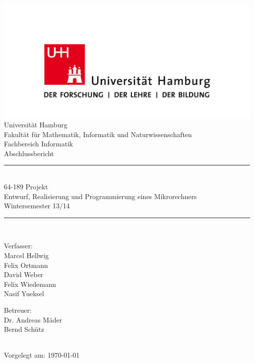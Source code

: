 


\begin{fullsizetitle}
\centering
\begin{minipage}{0.75\textwidth}
\vspace*{5em}
\begin{center}
\includegraphics[width=\textwidth]{images/uhh.png}\\
\vspace*{4em}
{\LARGE Universität Hamburg}\\[.25em]
{\Large Fakultät für Mathematik, Informatik und Naturwissenschaften}\\
{\Large Fachbereich Informatik}\\[3em]
{\Huge Abschlussbericht}\\[3em]

\newcommand{\HRule}{\rule{\linewidth}{0.5mm}}
\HRule\\[.4em]
{\Large%
64-189 Projekt\\%
Entwurf, Realisierung und Programmierung eines Mikrorechners\\%
Wintersemester 13/14\\%
}
\HRule\\[3em]

\begin{minipage}[t]{0.4\textwidth}
\begin{flushleft} \large
Verfasser:\\[1em]%
Marcel Hellwig\\%
Felix Ortmann\\%
David Weber\\%
Felix Wiedemann\\%
Nasif Yueksel%
\end{flushleft}
\end{minipage}
\hfill
\begin{minipage}[t]{0.4\textwidth}
\begin{flushright} \large
Betreuer:\\[1em]
Dr. Andreas Mäder\\%
Bernd Schütz%
\end{flushright}
\end{minipage} \\[12em]

{\large Vorgelegt am: \today}
\end{center}
\end{minipage}
\end{fullsizetitle}


